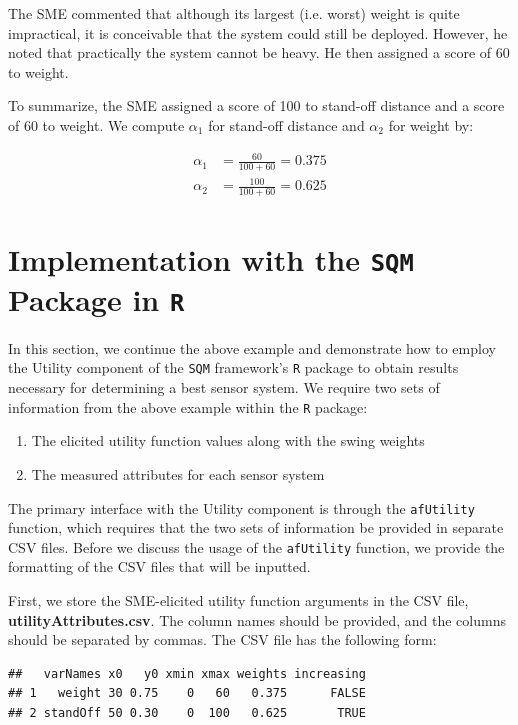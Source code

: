 \documentclass{article}
\makeatletter
\newenvironment{kframe}{%
 \def\FrameCommand##1{\hskip\@totalleftmargin \hskip-\fboxsep
 \colorbox{shadecolor}{##1}\hskip-\fboxsep
     \hskip-\linewidth \hskip-\@totalleftmargin \hskip\columnwidth}%
 \MakeFramed {\advance\hsize-\width
   \@totalleftmargin\z@ \linewidth\hsize
   \@setminipage}}%
 {\par\unskip\endMakeFramed}
\newenvironment{knitrout}{}{} %
\makeatother
\begin{document}
The SME commented that although its largest (i.e. worst) weight is quite
impractical, it is conceivable that the system could still be deployed. However,
he noted that practically the system cannot be heavy. He then assigned a score
of 60 to weight.

To summarize, the SME assigned a score of 100 to
stand-off distance and a score of 60 to weight. We compute $\alpha_1$
for stand-off distance and $\alpha_2$ for weight by:

\begin{align*}
  \alpha_1 &= \frac{60}{100 + 60}
    = 0.375\\
  \alpha_2 &= \frac{100}{100 + 60}
    = 0.625
\end{align*}

\section{Implementation with the {\tt SQM} Package in {\tt R}}







In this section, we continue the above example and demonstrate how to employ the
Utility component of the {\tt SQM} framework's {\tt R} package to obtain results necessary
for determining a best sensor system. We require two sets of information from the
above example within the {\tt R} package:

\begin{enumerate}
  \item The elicited utility function values along with the swing weights
  \item The measured attributes for each sensor system
\end{enumerate}

The primary interface with the Utility component is through the {\tt afUtility} function, which
requires that the two sets of information be provided in separate CSV files. Before we discuss
the usage of the {\tt afUtility} function, we provide the formatting of the CSV files that will
be inputted.




First, we store the SME-elicited utility function arguments in the CSV file,  \textbf{utilityAttributes.csv}.
The column names should be provided, and the columns should be separated by commas. The CSV file has
the following form:

\begin{knitrout}
\color{fgcolor}\begin{kframe}
\begin{verbatim}
##   varNames x0   y0 xmin xmax weights increasing
## 1   weight 30 0.75    0   60   0.375      FALSE
## 2 standOff 50 0.30    0  100   0.625       TRUE
\end{verbatim}
\end{kframe}
\end{knitrout}
\end{document}
